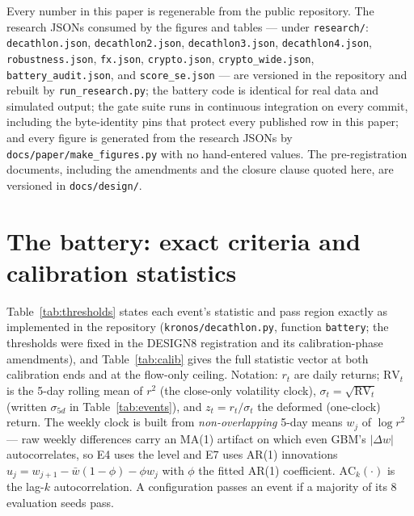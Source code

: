 \documentclass[11pt]{article}
\begin{document}
\begin{sloppypar}
Every number in this paper is regenerable from the public repository. The
research JSONs consumed by the figures and tables --- under
\texttt{research/}: \texttt{decathlon.json}, \texttt{decathlon2.json},
\texttt{decathlon3.json}, \texttt{decathlon4.json},
\texttt{robustness.json}, \texttt{fx.json},
\texttt{crypto.json}, \texttt{crypto\_wide.json},
\texttt{battery\_audit.json}, and \texttt{score\_se.json} --- are versioned
in the repository and rebuilt by
\texttt{run\_research.py}; the battery code is identical for real data and
simulated output; the gate suite runs in continuous integration on every
commit, including the byte-identity pins that protect every published row in
this paper; and every figure is generated from the research JSONs by
\texttt{docs/paper/make\_figures.py} with no hand-entered values. The
pre-registration documents, including the amendments and the closure clause
quoted here, are versioned in \texttt{docs/design/}.
\end{sloppypar}




\appendix

\section{The battery: exact criteria and calibration statistics}
\label{app:battery}

Table~\ref{tab:thresholds} states each event's statistic and pass region
exactly as
implemented in the repository (\texttt{kronos/decathlon.py}, function
\texttt{battery}; the thresholds were fixed in the DESIGN8 registration and
its calibration-phase amendments), and Table~\ref{tab:calib} gives the full
statistic vector at both calibration ends and at the flow-only ceiling.
Notation: $r_t$ are daily returns;
$\mathrm{RV}_t$ is the 5-day rolling mean of $r^2$ (the close-only volatility
clock), $\sigma_t = \sqrt{\mathrm{RV}_t}$ (written $\sigma_{5d}$ in
Table~\ref{tab:events}), and $z_t = r_t/\sigma_t$ the
deformed (one-clock) return. The weekly clock is built from
\emph{non-overlapping} 5-day means $w_j$ of $\log r^2$ --- raw weekly
differences carry an MA(1) artifact on which even GBM's $|\Delta w|$
autocorrelates, so E4 uses the level and E7 uses AR(1) innovations
$u_j = w_{j+1} - \bar w(1-\phi) - \phi w_j$ with $\phi$ the fitted AR(1)
coefficient. $\mathrm{AC}_k(\cdot)$ is the lag-$k$ autocorrelation.
A configuration passes an event if a majority of its 8 evaluation seeds pass.
\end{document}

